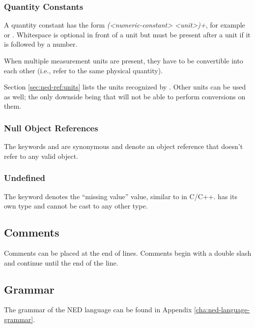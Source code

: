 \subsubsection{Quantity Constants}
\label{sec:ned-ref:quantity-constants}

A quantity constant has the form \textit{(<numeric-constant> <unit>)+}, for
example  or . Whitespace is optional in front
of a unit but must be present after a unit if it is followed by a number.

When multiple measurement units are present, they have to be convertible
into each other (i.e., refer to the same physical quantity).

Section \ref{sec:ned-ref:units} lists the units recognized by {\opp}.
Other units can be used as well; the only downside being that {\opp} will
not be able to perform conversions on them.

\subsubsection{Null Object References}
\label{sec:ned-ref:nullptr}

The keywords  and  are synonymous and
denote an object reference that doesn't refer to any valid object.

\subsubsection{Undefined}
\label{sec:ned-ref:undefined}

The keyword  denotes the ``missing value'' value, similar
to  in C/C++.  has its own type and
cannot be cast to any other type.


\subsection{Comments}
\label{sec:ned-ref:comments}

Comments can be placed at the end of lines. Comments begin with a double
slash \ttt{//} and continue until the end of the line.


\subsection{Grammar}
\label{sec:ned-ref:grammar}

The grammar of the NED language can be found in Appendix
\ref{cha:ned-language-grammar}.

